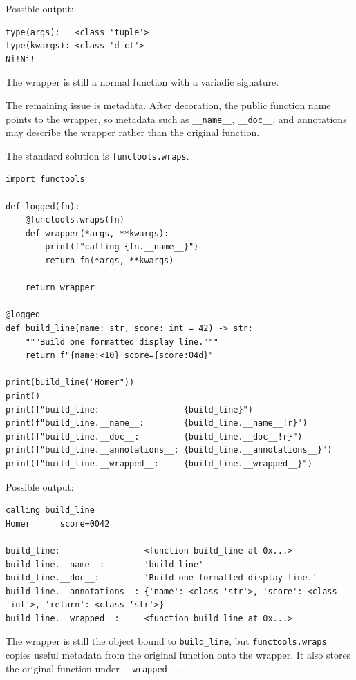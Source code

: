 Possible output:

\begin{verbatim}
type(args):   <class 'tuple'>
type(kwargs): <class 'dict'>
Ni!Ni!
\end{verbatim}

The wrapper is still a normal function with a variadic signature.

The remaining issue is metadata. After decoration, the public function name points to the wrapper, so metadata such as \texttt{\_\_name\_\_}, \texttt{\_\_doc\_\_}, and annotations may describe the wrapper rather than the original function.

The standard solution is \texttt{functools.wraps}.

\begin{verbatim}
import functools

def logged(fn):
    @functools.wraps(fn)
    def wrapper(*args, **kwargs):
        print(f"calling {fn.__name__}")
        return fn(*args, **kwargs)

    return wrapper

@logged
def build_line(name: str, score: int = 42) -> str:
    """Build one formatted display line."""
    return f"{name:<10} score={score:04d}"

print(build_line("Homer"))
print()
print(f"build_line:                 {build_line}")
print(f"build_line.__name__:        {build_line.__name__!r}")
print(f"build_line.__doc__:         {build_line.__doc__!r}")
print(f"build_line.__annotations__: {build_line.__annotations__}")
print(f"build_line.__wrapped__:     {build_line.__wrapped__}")
\end{verbatim}

Possible output:

\begin{verbatim}
calling build_line
Homer      score=0042

build_line:                 <function build_line at 0x...>
build_line.__name__:        'build_line'
build_line.__doc__:         'Build one formatted display line.'
build_line.__annotations__: {'name': <class 'str'>, 'score': <class 'int'>, 'return': <class 'str'>}
build_line.__wrapped__:     <function build_line at 0x...>
\end{verbatim}

The wrapper is still the object bound to \texttt{build\_line}, but \texttt{functools.wraps} copies useful metadata from the original function onto the wrapper. It also stores the original function under \texttt{\_\_wrapped\_\_}.

